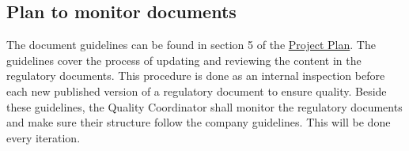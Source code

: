 \subsection{Plan to monitor documents}
The document guidelines can be found in section 5 of the \href{https://gitlab.liu.se/tddc88-company-1-2021/deploy/-/tree/develop/documents/Project\%20Plan}{Project Plan}. The guidelines cover the process of updating and reviewing the content in the regulatory documents. This procedure is done as an internal inspection before each new published version of a regulatory document to ensure quality. Beside these guidelines, the Quality Coordinator shall monitor the regulatory documents and make sure their structure follow the company guidelines. This will be done every iteration.


